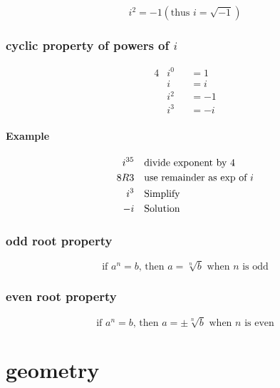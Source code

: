 \documentclass[a4paper,12pt]{article}
\begin{document}
\[ i^{2}=-1 \left( \text{thus } i=\sqrt{-1} \right) \]

\subsubsection{cyclic property of powers of \( i \) }

\begin{alignat*}{4}
&i^{0} &&= 1 \\
&i  &&= i \\
&i^{2} &&= -1 \\
&i^{3} &&= -i
\end{alignat*}

\paragraph{Example}

\begin{alignat*}{2}
    i^{35} \quad & \text{\raggedleft divide exponent by 4} \\
    8R3 \quad & \text{use remainder as exp of }i  \\
    i^{3} \quad & \text{Simplify} \\
    -i \quad & \text{Solution}
\end{alignat*}

\begin{center}
\end{center}

\subsubsection{odd root property}

\[ \text{if } a^{n} = b \text{, then } a = \sqrt[n]{b} \text{ when } n \text{ is odd} \]

\subsubsection{even root property}

\[ \text{if } a^{n} = b \text{, then } a = \pm\sqrt[n]{b} \text{ when } n \text{ is even} \]
\section{geometry}
\end{document}
